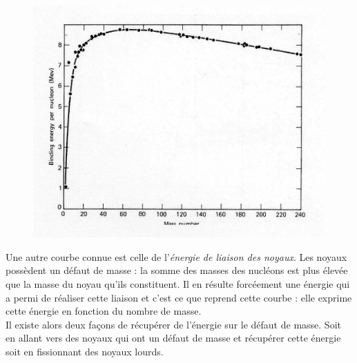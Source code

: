 	\begin{figure}
	\vspace{-8mm}
	\includegraphics[scale=0.13]{ch1/image2.png}
	\end{figure}
Une autre courbe connue est celle de l'\textit{énergie de liaison des noyaux}. Les noyaux 
possèdent un défaut de masse : la somme des masses des nucléons est plus élevée que la 
masse du noyau qu'ils constituent. Il en résulte forcéement une énergie qui a permi de 
réaliser cette liaison et c'est ce que reprend cette courbe : elle exprime cette énergie 
en fonction du nombre de masse.\\

Il existe alors deux façons de récupérer de l'énergie sur le défaut de masse. Soit en allant 
vers des noyaux qui ont un défaut de masse et récupérer cette énergie soit en fissionnant 
des noyaux lourds. 

